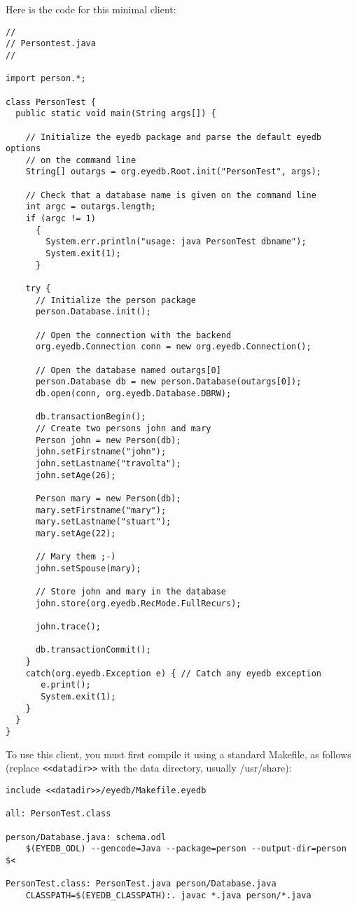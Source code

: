 Here is the code for this minimal client:
\verbsize \begin{verbatim}
//
// Persontest.java
//

import person.*;

class PersonTest {
  public static void main(String args[]) {

    // Initialize the eyedb package and parse the default eyedb options
    // on the command line
    String[] outargs = org.eyedb.Root.init("PersonTest", args);
     
    // Check that a database name is given on the command line
    int argc = outargs.length;
    if (argc != 1)
      {
        System.err.println("usage: java PersonTest dbname");
        System.exit(1);
      }

    try {
      // Initialize the person package
      person.Database.init();

      // Open the connection with the backend
      org.eyedb.Connection conn = new org.eyedb.Connection();

      // Open the database named outargs[0]
      person.Database db = new person.Database(outargs[0]);
      db.open(conn, org.eyedb.Database.DBRW);

      db.transactionBegin();
      // Create two persons john and mary
      Person john = new Person(db);
      john.setFirstname("john");
      john.setLastname("travolta");
      john.setAge(26);
     
      Person mary = new Person(db);
      mary.setFirstname("mary");
      mary.setLastname("stuart");
      mary.setAge(22);
     
      // Mary them ;-)
      john.setSpouse(mary);

      // Store john and mary in the database
      john.store(org.eyedb.RecMode.FullRecurs);

      john.trace();

      db.transactionCommit();
    }
    catch(org.eyedb.Exception e) { // Catch any eyedb exception
       e.print();
       System.exit(1);
    }
  }
}
\end{verbatim}
\normalsize

To use this client, you must first compile it using a standard Makefile, as follows 
(replace \texttt{<<datadir>>} with the data directory, usually /usr/share):
\verbsize \begin{verbatim}
include <<datadir>>/eyedb/Makefile.eyedb

all: PersonTest.class

person/Database.java: schema.odl
	$(EYEDB_ODL) --gencode=Java --package=person --output-dir=person $<

PersonTest.class: PersonTest.java person/Database.java
	CLASSPATH=$(EYEDB_CLASSPATH):. javac *.java person/*.java
\end{verbatim} %
\normalsize 

